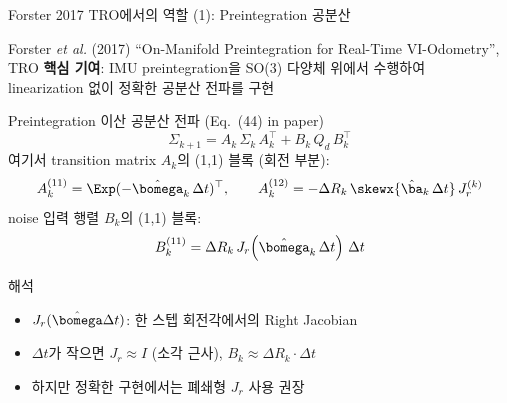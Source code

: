 \begin{frame}[shrink=5]{Forster 2017 TRO에서의 역할 (1): Preintegration 공분산}
  \begin{block}{Forster \textit{et al.} (2017) ``On-Manifold Preintegration for Real-Time VI-Odometry'', TRO}
    \textbf{핵심 기여}: IMU preintegration을 SO(3) 다양체 위에서 수행하여\\
    linearization 없이 정확한 공분산 전파를 구현
  \end{block}
  \pause
  \begin{alertblock}{Preintegration 이산 공분산 전파 (Eq.~(44) in paper)}
    \[
      \Sigma_{k+1} = A_k\,\Sigma_k\,A_k^\top + B_k\,Q_d\,B_k^\top
    \]
    여기서 transition matrix $A_k$의 (1,1) 블록 (회전 부분):
    \[
      A_k^{(11)} = \Exp(-\hat{\bomega}_k\,\Delta t)^\top, \qquad
      A_k^{(12)} = -\Delta R_k\,\skewx{\hat{\ba}_k\,\Delta t}\,J_r^{(k)}
    \]
    noise 입력 행렬 $B_k$의 (1,1) 블록:
    \[
      B_k^{(11)} = \Delta R_k\,J_r\!\left(\hat{\bomega}_k\,\Delta t\right)\,\Delta t
    \]
  \end{alertblock}
  \pause
  \begin{exampleblock}{해석}
    \begin{itemize}
      \item $J_r(\hat{\bomega}\Delta t)$: 한 스텝 회전각에서의 Right Jacobian
      \item $\Delta t$가 작으면 $J_r \approx I$ (소각 근사), $B_k \approx \Delta R_k \cdot \Delta t$
      \item 하지만 정확한 구현에서는 폐쇄형 $J_r$ 사용 권장
    \end{itemize}
  \end{exampleblock}
\end{frame}


